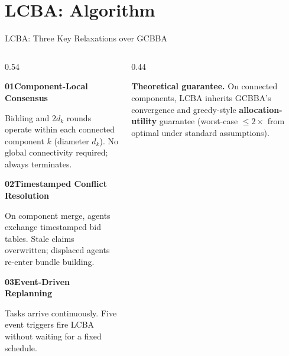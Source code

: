 \documentclass[aspectratio=169, 11pt]{beamer}
\newcommand{\subheader}[1]{{\rmfamily\bfseries\normalsize\color{TextPrimary} #1}}
\newcommand{\smallcap}[1]{{\rmfamily\small\color{TextSecondary} #1}}
\begin{document}
\section{LCBA: Algorithm}

\begin{frame}{LCBA: Three Key Relaxations over GCBBA}
  \begin{columns}[T]
    \begin{column}{0.54\textwidth}
      \vspace{4pt}
      
      \subheader{\textcolor{TextMuted}{01}\hspace{6pt}Component-Local Consensus}\par\vspace{2pt}
      \smallcap{Bidding and $2d_k$ rounds operate within each connected component $k$ (diameter $d_k$). No global connectivity required; always terminates.}

      \vspace{14pt}

      \subheader{\textcolor{TextMuted}{02}\hspace{6pt}Timestamped Conflict Resolution}\par\vspace{2pt}
      \smallcap{On component merge, agents exchange timestamped bid tables. Stale claims overwritten; displaced agents re-enter bundle building.}

      \vspace{14pt}

      \subheader{\textcolor{TextMuted}{03}\hspace{6pt}Event-Driven Replanning}\par\vspace{2pt}
      \smallcap{Tasks arrive continuously. Five event triggers fire LCBA without waiting for a fixed schedule.}
    \end{column}

    \begin{column}{0.44\textwidth}
      \vspace{-12pt}
      \begin{infobox}[top=4pt, bottom=4pt]
        \textbf{Theoretical guarantee.} On connected components, LCBA inherits GCBBA's convergence and greedy-style \textbf{allocation-utility} guarantee (worst-case $\leq 2\times$ from optimal under standard assumptions).
      \end{infobox}
      
    \end{column}
  \end{columns}
\end{frame}
\end{document}
